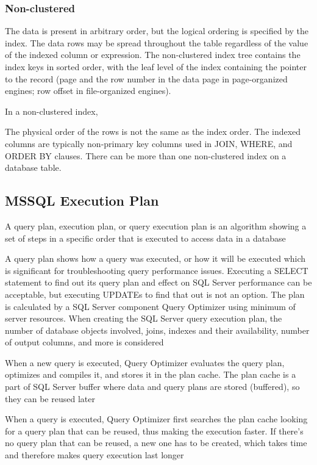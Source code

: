 \subsubsection{Non-clustered}
The data is present in arbitrary order, but the logical ordering is specified by the index. The data rows may be spread throughout the table regardless of the value of the indexed column or expression. The non-clustered index tree contains the index keys in sorted order, with the leaf level of the index containing the pointer to the record (page and the row number in the data page in page-organized engines; row offset in file-organized engines).

In a non-clustered index,

The physical order of the rows is not the same as the index order.
The indexed columns are typically non-primary key columns used in JOIN, WHERE, and ORDER BY clauses.
There can be more than one non-clustered index on a database table.

\subsection{MSSQL Execution Plan}
A query plan, execution plan, or query execution plan is an algorithm showing a set of steps in a specific order that is executed to access data in a database

A query plan shows how a query was executed, or how it will be executed which is significant for troubleshooting query performance issues. Executing a SELECT statement to find out its query plan and effect on SQL Server performance can be acceptable, but executing UPDATEs to find that out is not an option. The plan is calculated by a SQL Server component Query Optimizer using minimum of server resources. When creating the SQL Server query execution plan, the number of database objects involved, joins, indexes and their availability, number of output columns, and more is considered

When a new query is executed, Query Optimizer evaluates the query plan, optimizes and compiles it, and stores it in the plan cache. The plan cache is a part of SQL Server buffer where data and query plans are stored (buffered), so they can be reused later

When a query is executed, Query Optimizer first searches the plan cache looking for a query plan that can be reused, thus making the execution faster. If there’s no query plan that can be reused, a new one has to be created, which takes time and therefore makes query execution last longer

